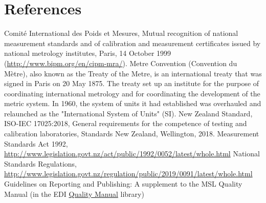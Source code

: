\section{References}

\begingroup
\renewcommand{\section}[2]{}%

\begin{thebibliography}{9}
 Comit\'e International des Poids et Mesures, Mutual recognition of national measurement standards and of calibration and measurement certificates issued by national metrology institutes, Paris, 14 October 1999 (\url{http://www.bipm.org/en/cipm-mra/}).
 Metre Convention (Convention du M\`etre), also known as the Treaty of the Metre, is an international treaty that was signed in Paris on 20 May 1875. The treaty set up an institute for the purpose of coordinating international metrology and for coordinating the development of the metric system. In 1960, the system of units it had established was overhauled and relaunched as the "International System of Units" (SI).
 New Zealand Standard, ISO-IEC 17025:2018, General requirements for the competence of testing and calibration laboratories, Standards New Zealand, Wellington, 2018.
 {Measurement Standards Act 1992}, \url{http://www.legislation.govt.nz/act/public/1992/0052/latest/whole.html}
 {National Standards Regulations}, \url{http://www.legislation.govt.nz/regulation/public/2019/0091/latest/whole.html}
 Guidelines on Reporting and Publishing: A supplement to the MSL Quality Manual (in the EDI \href{https://edi.callaghaninnovation.govt.nz/ws/msl/QMS/QM?Web=1}{Quality Manual} library)
\end{thebibliography}

\endgroup